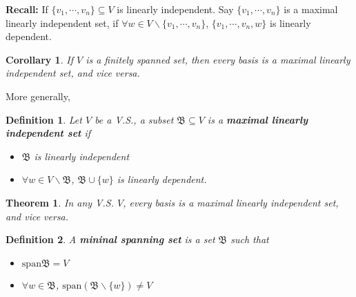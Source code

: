 \documentclass[12pt]{article}
\theoremstyle{plain}
\newtheorem{theorem}{Theorem}[subsection]
\newtheorem{definition}{Definition}[subsection]
\newtheorem{corollary}{Corollary}[subsection]
\newcommand{\Span}{\mathrm{span}}
\begin{document}
	\textbf{Recall: } If $\{v_1, \cdots, v_n\} \subseteq V$ is linearly 
	independent. Say $\{v_1, \cdots, v_n\}$ is a maximal linearly independent
	set, if $\forall w \in V\backslash \{v_1, \cdots, v_n\}$,  
	$\{v_1, \cdots, v_n, w\}$ is linearly dependent. \\

	\begin{corollary}
		If $V$ is a finitely spanned set, then every basis is a maximal
		linearly independent set, and vice versa. \\
	\end{corollary}

	More generally, 
	\begin{definition}
		Let $V$ be a V.S., a subset $\mathfrak{B} \subseteq V$ is a 
		\textbf{maximal linearly independent set} if 
		\begin{itemize}
			\item $\mathfrak{B}$ is linearly independent
			\item $\forall w \in V\backslash \mathfrak{B}$, 
				$\mathfrak{B} \cup \{w\}$ is linearly dependent.\\ 
		\end{itemize}
	\end{definition}

	\begin{theorem}
		In any V.S. $V$, every basis is a maximal linearly independent set,
		and vice versa.\\
	\end{theorem}

	\begin{definition}
		A \textbf{mininal spanning set} is a set $\mathfrak{B}$ such that
		\begin{itemize}
			\item $\Span\mathfrak{B} = V$
			\item $\forall w \in \mathfrak{B}$, $\Span(\mathfrak{B}\backslash
				\{w\}) \neq V$\\
		\end{itemize}
	\end{definition}
	
\end{document}
